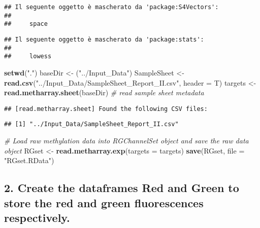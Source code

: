 \documentclass[
]{article}
\newenvironment{Shaded}{\begin{snugshade}}{\end{snugshade}}
\newcommand{\AttributeTok}[1]{\textcolor[rgb]{0.13,0.29,0.53}{#1}}
\newcommand{\CommentTok}[1]{\textcolor[rgb]{0.56,0.35,0.01}{\textit{#1}}}
\newcommand{\FunctionTok}[1]{\textcolor[rgb]{0.13,0.29,0.53}{\textbf{#1}}}
\newcommand{\NormalTok}[1]{#1}
\newcommand{\OtherTok}[1]{\textcolor[rgb]{0.56,0.35,0.01}{#1}}
\newcommand{\StringTok}[1]{\textcolor[rgb]{0.31,0.60,0.02}{#1}}
\begin{document}
\begin{verbatim}
## Il seguente oggetto è mascherato da 'package:S4Vectors':
## 
##     space
\end{verbatim}

\begin{verbatim}
## Il seguente oggetto è mascherato da 'package:stats':
## 
##     lowess
\end{verbatim}

\begin{Shaded}
\begin{Highlighting}[]
\FunctionTok{setwd}\NormalTok{(}\StringTok{"."}\NormalTok{)}
\NormalTok{baseDir }\OtherTok{\textless{}{-}}\NormalTok{ (}\StringTok{"../Input\_Data"}\NormalTok{)}
\NormalTok{SampleSheet }\OtherTok{\textless{}{-}} \FunctionTok{read.csv}\NormalTok{(}\StringTok{"../Input\_Data/SampleSheet\_Report\_II.csv"}\NormalTok{, }\AttributeTok{header =}
\NormalTok{                          T)}
\NormalTok{targets }\OtherTok{\textless{}{-}} \FunctionTok{read.metharray.sheet}\NormalTok{(baseDir) }\CommentTok{\# read sample sheet metadata}
\end{Highlighting}
\end{Shaded}

\begin{verbatim}
## [read.metharray.sheet] Found the following CSV files:
\end{verbatim}

\begin{verbatim}
## [1] "../Input_Data/SampleSheet_Report_II.csv"
\end{verbatim}

\begin{Shaded}
\begin{Highlighting}[]
\CommentTok{\# Load raw methylation data into RGChannelSet object and save the raw data object}
\NormalTok{RGset }\OtherTok{\textless{}{-}} \FunctionTok{read.metharray.exp}\NormalTok{(}\AttributeTok{targets =}\NormalTok{ targets)}
\FunctionTok{save}\NormalTok{(RGset, }\AttributeTok{file =} \StringTok{"RGset.RData"}\NormalTok{)}
\end{Highlighting}
\end{Shaded}

\subsection{2. Create the dataframes Red and Green to store the red and
green fluorescences
respectively.}\label{create-the-dataframes-red-and-green-to-store-the-red-and-green-fluorescences-respectively.}
\end{document}
